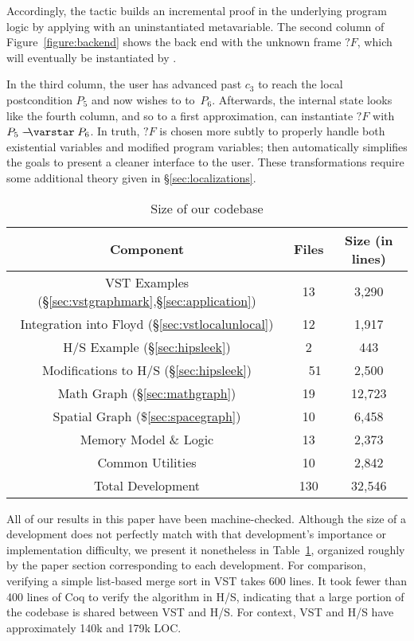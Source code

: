 Accordingly, the  tactic builds an incremental proof in the underlying program logic by applying  with an uninstantiated metavariable.
The second column of Figure~\ref{figure:backend} shows the back end with the unknown frame $?F$, which will eventually be instantiated by .

In the third column, the user has advanced past $c_3$ to reach the local postcondition $P_5$ and now wishes to  to~$P_6$.  Afterwards, the internal state looks like the fourth column, and so to a first approximation,  can instantiate $?F$ with $P_5 \wand P_6$.  In truth, $?F$ is chosen more subtly to properly handle both existential variables and modified program variables;  then automatically simplifies the goals to present a cleaner interface to the user.  These transformations require some additional theory given in \S\ref{sec:localizations}.


\begin{table}[t]
\centering
\begin{tabular}{c|c|c}
Component & Files & Size (in lines)\\\hline
VST Examples (\S\ref{sec:vstgraphmark},\S\ref{sec:application}) & 13 & 3,290 \\
Integration into Floyd (\S\ref{sec:vstlocalunlocal}) & 12 & 1,917 \\
H/S Example (\S\ref{sec:hipsleek}) & 2 & 443 \\
Modifications to H/S (\S\ref{sec:hipsleek}) & ~~51 & 2,500 \\
Math Graph (\S\ref{sec:mathgraph}) & 19 & 12,723\\
Spatial Graph (\$\ref{sec:spacegraph}) & 10 & 6,458 \\
Memory Model \& Logic & 13 & 2,373 \\
Common Utilities & 10 & 2,842 \\\hline\hline
Total Development & 130 & 32,546 \\
\end{tabular}
\caption{Size of our codebase}
\label{tab:codebase}
\end{table}

All of our results in this paper have been machine-checked.  
Although the size of a development does not perfectly match with that development's importance or implementation difficulty, we present it nonetheless in Table~\ref{tab:codebase}, organized roughly by the paper section corresponding to each development.  For comparison, verifying a simple list-based merge sort in VST takes 600 lines.  It took fewer than 400 lines of Coq to verify the  algorithm in H/S, indicating that a large portion of the codebase is shared between VST and H/S.  For context, VST and H/S have approximately 140k and 179k LOC.

